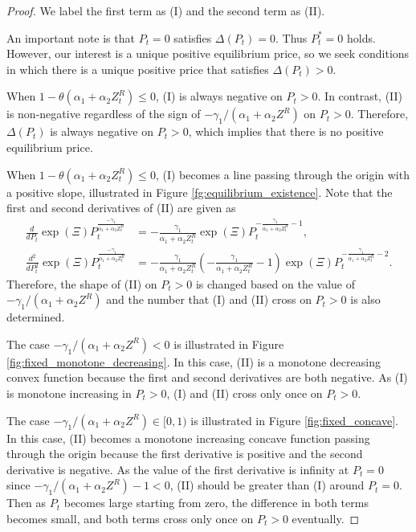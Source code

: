 \documentclass[11pt, a4paper]{article}
\begin{document}
\begin{proof}
We label the first term as (I) and the second term as (II).

An important note is that $P_t =0$ satisfies $\Delta(P_{t}) = 0$.
Thus $P_t^* = 0$ holds.
However, our interest is a unique positive equilibrium price, so we seek conditions in which there is a unique positive price that satisfies $\Delta(P_t)>0$.
    
When $1 - \theta (\alpha_1 + \alpha_2 Z^{R}_{t}) \le 0$, (I) is always negative on $P_t >0$. 
In contrast, (II) is non-negative regardless of the sign of $-\gamma_1/(\alpha_1+\alpha_2 Z^R)$ on $P_t > 0$.
Therefore, $\Delta(P_t)$ is always negative on $P_t>0$, which implies that there is no positive equilibrium price.

When $1 - \theta (\alpha_1 + \alpha_2 Z^{R}_{t}) \le 0$, (I) becomes a line passing through the origin with a positive slope, illustrated in Figure \ref{fg:equilibrium_existence}. 
Note that the first and second derivatives of (II) are given as
\begin{align}
    \frac{d}{dP_t}\exp(\Xi) P_t^{\frac{-\gamma_1}{\alpha_1 + \alpha_2 Z^{R}_{t}}} &= -\frac{\gamma_1}{\alpha_1 + \alpha_2 Z^R_t} \exp(\Xi)P_t^{-\frac{\gamma_1}{\alpha_1 + \alpha_2 Z^R_t} - 1},\\
    \frac{d^2}{dP_t^2} \exp(\Xi) P_t^{\frac{-\gamma_1}{\alpha_1 + \alpha_2 Z^{R}_{t}}} &= -\frac{\gamma_1}{\alpha_1 + \alpha_2 Z^R_t}\left(-\frac{\gamma_1}{\alpha_1 + \alpha_2 Z^R_t} - 1\right) \exp(\Xi) P_t^{-\frac{\gamma_1}{\alpha_1 + \alpha_2 Z^R_t} - 2}.
\end{align}
Therefore, the shape of (II) on $P_t >0$ is changed based on the value of $-\gamma_1/(\alpha_1+\alpha_2 Z^R)$ and the number that (I) and (II) cross on $P_t >0$ is also determined.

The case $-\gamma_1/(\alpha_1+\alpha_2 Z^R) < 0$ is illustrated in Figure \ref{fig:fixed_monotone_decreasing}. In this case, (II) is a monotone decreasing convex function because the first and second derivatives are both negative. As (I) is monotone increasing in $P_t >0$, (I) and (II) cross only once on $P_t >0$.

The case $-\gamma_1/(\alpha_1+\alpha_2 Z^R) \in [0, 1)$ is illustrated in Figure \ref{fig:fixed_concave}. In this case, (II) becomes a monotone increasing concave function passing through the origin because the first derivative is positive and the second derivative is negative.
As the value of the first derivative is infinity at $P_t = 0$ since $-\gamma_1/(\alpha_1+\alpha_2 Z^R)-1<0$, (II) should be greater than (I) around $P_t = 0$. Then as $P_t$ becomes large starting from zero, the difference in both terms becomes small, and both terms cross only once on $P_t >0$ eventually.


\end{proof}
\end{document}
